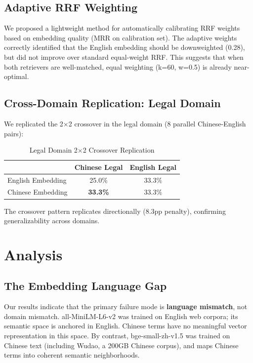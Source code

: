 ﻿\documentclass[11pt,a4paper]{article}
\begin{document}
\subsection{Adaptive RRF Weighting}

We proposed a lightweight method for automatically calibrating RRF weights based on embedding quality (MRR on calibration set). The adaptive weights correctly identified that the English embedding should be downweighted (0.28), but did not improve over standard equal-weight RRF. This suggests that when both retrievers are well-matched, equal weighting (k=60, w=0.5) is already near-optimal.

\subsection{Cross-Domain Replication: Legal Domain}

We replicated the 2$\times$2 crossover in the legal domain (8 parallel Chinese-English pairs):

\begin{table}[h]
\centering
\caption{Legal Domain 2$\times$2 Crossover Replication}
\begin{tabular}{lcc}
\toprule
& \textbf{Chinese Legal} & \textbf{English Legal} \\
\midrule
English Embedding & 25.0\% & 33.3\% \\
Chinese Embedding & \textbf{33.3\%} & 33.3\% \\
\bottomrule
\end{tabular}
\end{table}

The crossover pattern replicates directionally (8.3pp penalty), confirming generalizability across domains.

\section{Analysis}

\subsection{The Embedding Language Gap}

Our results indicate that the primary failure mode is \textbf{language mismatch}, not domain mismatch. all-MiniLM-L6-v2 was trained on English web corpora; its semantic space is anchored in English. Chinese terms have no meaningful vector representation in this space. By contrast, bge-small-zh-v1.5 was trained on Chinese text (including Wudao, a 200GB Chinese corpus), and maps Chinese terms into coherent semantic neighborhoods.
\end{document}
